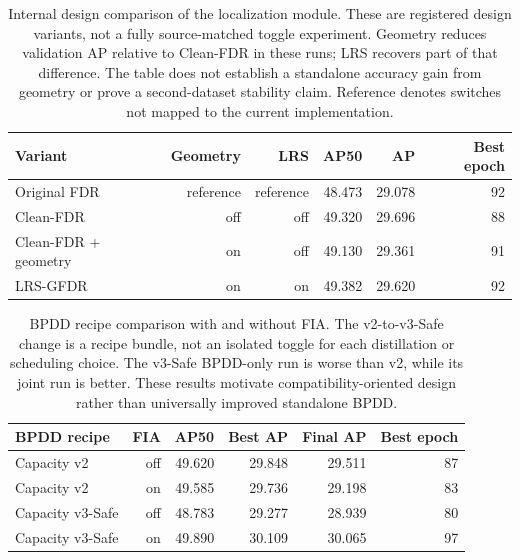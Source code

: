 \begin{table}[t]
\centering
\small
\caption{Internal design comparison of the localization module. These are registered design variants, not a fully source-matched toggle experiment. Geometry reduces validation AP relative to Clean-FDR in these runs; LRS recovers part of that difference. The table does not establish a standalone accuracy gain from geometry or prove a second-dataset stability claim. Reference denotes switches not mapped to the current implementation.}
\label{tab:t3}
\begin{tabular}{lrrrrr}
\toprule
Variant & Geometry & LRS & AP50 & AP & Best epoch \\
\midrule
Original FDR & reference & reference & 48.473 & 29.078 & 92 \\
Clean-FDR & off & off & 49.320 & 29.696 & 88 \\
Clean-FDR + geometry & on & off & 49.130 & 29.361 & 91 \\
LRS-GFDR & on & on & 49.382 & 29.620 & 92 \\
\bottomrule
\end{tabular}
\end{table}

\begin{table}[t]
\centering
\small
\caption{BPDD recipe comparison with and without FIA. The v2-to-v3-Safe change is a recipe bundle, not an isolated toggle for each distillation or scheduling choice. The v3-Safe BPDD-only run is worse than v2, while its joint run is better. These results motivate compatibility-oriented design rather than universally improved standalone BPDD.}
\label{tab:t4}
\begin{tabular}{lrrrrr}
\toprule
BPDD recipe & FIA & AP50 & Best AP & Final AP & Best epoch \\
\midrule
Capacity v2 & off & 49.620 & 29.848 & 29.511 & 87 \\
Capacity v2 & on & 49.585 & 29.736 & 29.198 & 83 \\
Capacity v3-Safe & off & 48.783 & 29.277 & 28.939 & 80 \\
Capacity v3-Safe & on & 49.890 & 30.109 & 30.065 & 97 \\
\bottomrule
\end{tabular}
\end{table}

